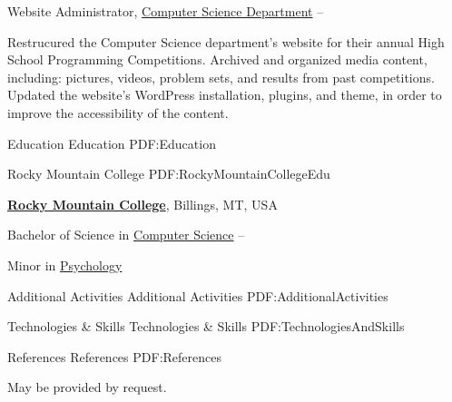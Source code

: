 \documentclass[letterpaper,MMMyyyy,nonstopmode]{simpleresumecv}
\begin{document}
\begin{Body}
\Gap
\BulletItem
Website Administrator,
\href{http://cs.rocky.edu/programming-competitions/high-school-competions/}
{Computer Science Department}
\hfill
{} --
\begin{Detail}
\SubBulletItem
Restrucured the Computer Science department's website for their annual High School Programming Competitions.
\SubBulletItem
Archived and organized media content, including: pictures, videos, problem sets, and results from past competitions.
\SubBulletItem
Updated the website's WordPress installation, plugins, and theme, in order to improve the accessibility of the content.
\end{Detail}


\Section
{Education}
{Education}
{PDF:Education}

\SubSection
{}
{Rocky Mountain College}
{PDF:RockyMountainCollegeEdu}

\Entry
\href{http://www.rocky.edu/}
{\textbf{Rocky Mountain College}},
Billings, MT, USA

\Gap
\BulletItem
Bachelor of Science in
\href{http://cs.rocky.edu/}
{Computer Science}
\hfill
{} --
\begin{Detail}
\SubBulletItem
Minor in 
\href{http://rocky.edu/academics/academic-programs/undergraduate-majors/psychology/}
{Psychology}
\end{Detail}


\Section
{Additional \newline Activities}
{Additional Activities}
{PDF:AdditionalActivities}


\Section
{Technologies \newline \& Skills}
{Technologies \& Skills}
{PDF:TechnologiesAndSkills}


\Section
{References}
{References}
{PDF:References}

May be provided by request.

\end{Body}
\end{document}
